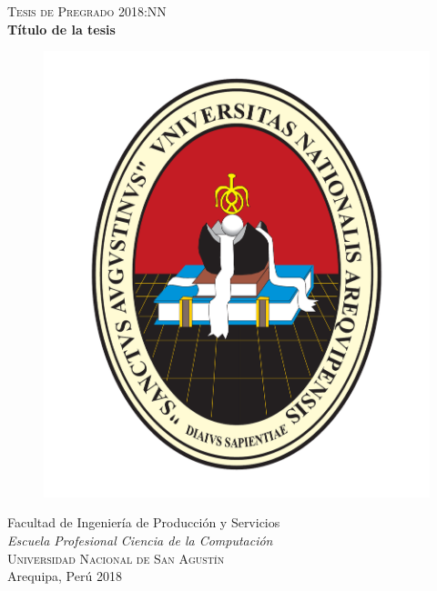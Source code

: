\newpage
\restoregeometry
\thispagestyle{empty}
\mbox{}


\newpage
\thispagestyle{empty}
\begin{center}
	\textsc{\large Tesis de Pregrado 2018:NN}\\[4cm]		%
	\textbf{\Large Título de la tesis} \\[1cm]
	
	\vfill	
	\begin{figure}[H]
	\centering
	\includegraphics[width=0.2\pdfpagewidth]{figure/auxiliary/logo_unsa.pdf} \\	
	\end{figure}	\vspace{5mm}	
	
	Facultad de Ingeniería de Producción y Servicios\\
	\emph{Escuela Profesional Ciencia de la Computaci\'on}\\
	\textsc{Universidad Nacional de San Agustín} \\
	Arequipa, Per\'u 2018 \\
\end{center}


